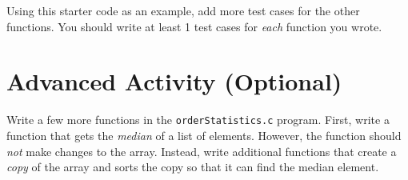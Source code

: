 \documentclass[12pt]{scrartcl}
\begin{document}
Using this starter code as an example, add more test cases for the 
other functions.  You should write at least 1 test cases for 
\emph{each} function you wrote.  

\section{Advanced Activity (Optional)}

Write a few more functions in the \texttt{orderStatistics.c} program.  First,
write a function that gets the \emph{median} of a list of elements.  However, the
function should \emph{not} make changes to the array.  Instead, write additional
functions that create a \emph{copy} of the array and sorts the copy so that it can
find the median element.  
\end{document}
